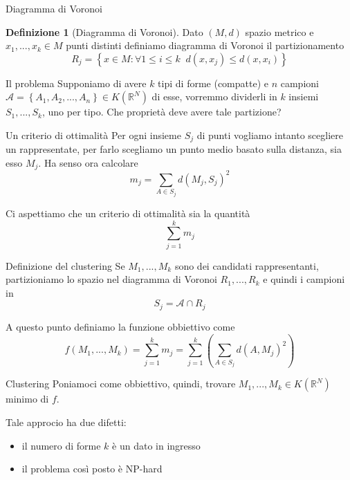 \documentclass{beamer}
\newcounter{counter1}
\theoremstyle{plain}
\theoremstyle{definition}
\newtheorem{mydef}[counter1]{Definizione}
\theoremstyle{remark}
\newcommand{\set}[1]{\left\{#1\right\}}
\newcommand{\pa}[1]{\left(#1\right)}
\begin{document}
\begin{frame}{Diagramma di Voronoi}
  \begin{mydef}[Diagramma di Voronoi]
    Dato $(M,d)$ spazio metrico e $x_1,...,x_k \in M$ punti distinti
    definiamo diagramma di Voronoi il partizionamento
    \[ R_j = \set{ x\in M : \forall 1 \le i \le k \;\; d(x,x_j) \le
      d(x,x_i) } \]
  \end{mydef}
\end{frame}

\begin{frame}{Il problema}
  Supponiamo di avere $k$ tipi di forme (compatte) e $n$ campioni
  $\mathcal{A} = \set{ A_1, A_2,..., A_n} \in K(\mathbb{R}^N)$ di esse,
  vorremmo dividerli in $k$ insiemi $S_1,...,S_k$, uno per tipo. Che
  proprietà deve avere tale partizione?
\end{frame}

\begin{frame}{Un criterio di ottimalità}
  Per ogni insieme $S_j$ di punti vogliamo intanto scegliere un
  rappresentate, per farlo scegliamo un punto medio basato sulla
  distanza, sia esso $M_j$. Ha senso ora calcolare
  \[ m_j = \sum _{A\in S_j} d(M_j,S_j)^2 \]
  
  \vfill

  Ci aspettiamo che un criterio di ottimalità sia la quantità
  \[ \sum _{j=1} ^k m_j \]
\end{frame}

\begin{frame}{Definizione del clustering}
  Se $M_1,...,M_k$ sono dei candidati rappresentanti, partizioniamo lo
  spazio nel diagramma di Voronoi $R_1,...,R_k$ e quindi i campioni in
  \[ S_j = \mathcal{A} \cap R_j \]
  
  \vfill

  A questo punto definiamo la funzione obbiettivo come
  \[ f(M_1,...,M_k) = \sum _{j = 1} ^k m_j = \sum _{j = 1} ^k \pa{ \sum
    _{A \in S_j} d(A,M_j)^2 } \]
\end{frame}

\begin{frame}{Clustering}
  Poniamoci come obbiettivo, quindi, trovare $M_1,...,M_k \in
  K(\mathbb{R}^N)$ minimo di $f$.
  
  \vfill

  Tale approcio ha due difetti:
  \begin{itemize}
  \item il numero di forme $k$ è un dato in ingresso
  \item il problema così posto è NP-hard
  \end{itemize}
\end{frame}
\end{document}
